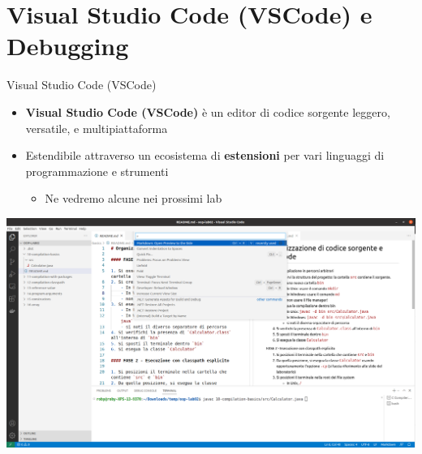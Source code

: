 \documentclass[xcolor=dvipsnames,presentation]{beamer}
\begin{document}
\section{Visual Studio Code (VSCode) e Debugging}

\begin{frame}{Visual Studio Code (VSCode)}

\begin{itemize}
\item \textbf{Visual Studio Code (VSCode)} è un editor di codice sorgente leggero, versatile, e multipiattaforma
\item Estendibile attraverso un ecosistema di \textbf{estensioni} per vari linguaggi di programmazione e strumenti
	\begin{itemize}
	\item Ne vedremo alcune nei prossimi lab
	\end{itemize}
\end{itemize}

\end{frame}

\begin{frame}

\includegraphics[width=\textwidth]{img/vscode.png}

\end{frame}
\end{document}
